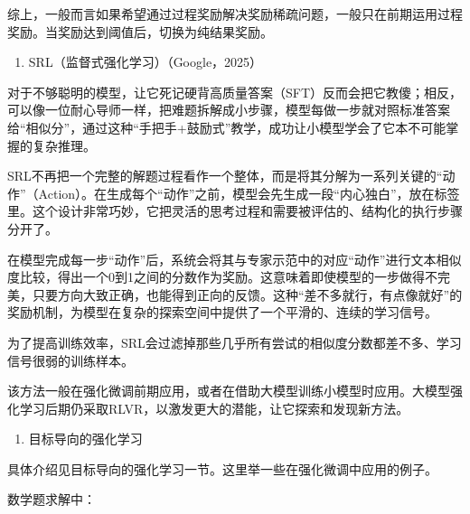 综上，一般而言如果希望通过过程奖励解决奖励稀疏问题，一般只在前期运用过程奖励。当奖励达到阈值后，切换为纯结果奖励。

\begin{enumerate}
\def\labelenumi{\arabic{enumi}.}
\setcounter{enumi}{1}
\tightlist
\item
  SRL（监督式强化学习）（Google，2025）
\end{enumerate}

对于不够聪明的模型，让它死记硬背高质量答案（SFT）反而会把它教傻；相反，可以像一位耐心导师一样，把难题拆解成小步骤，模型每做一步就对照标准答案给``相似分''，通过这种``手把手+鼓励式''教学，成功让小模型学会了它本不可能掌握的复杂推理。

SRL不再把一个完整的解题过程看作一个整体，而是将其分解为一系列关键的``动作''（Action）。在生成每个``动作''之前，模型会先生成一段``内心独白''，放在标签里。这个设计非常巧妙，它把灵活的思考过程和需要被评估的、结构化的执行步骤分开了。

在模型完成每一步``动作''后，系统会将其与专家示范中的对应``动作''进行文本相似度比较，得出一个0到1之间的分数作为奖励。这意味着即使模型的一步做得不完美，只要方向大致正确，也能得到正向的反馈。这种``差不多就行，有点像就好''的奖励机制，为模型在复杂的探索空间中提供了一个平滑的、连续的学习信号。

为了提高训练效率，SRL会过滤掉那些几乎所有尝试的相似度分数都差不多、学习信号很弱的训练样本。

该方法一般在强化微调前期应用，或者在借助大模型训练小模型时应用。大模型强化学习后期仍采取RLVR，以激发更大的潜能，让它探索和发现新方法。

\begin{enumerate}
\def\labelenumi{\arabic{enumi}.}
\setcounter{enumi}{2}
\tightlist
\item
  目标导向的强化学习
\end{enumerate}

具体介绍见目标导向的强化学习一节。这里举一些在强化微调中应用的例子。

数学题求解中：


